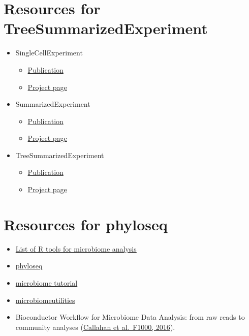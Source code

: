 \documentclass[
  oneside]{book}
\providecommand{\tightlist}{%
  \setlength{\itemsep}{0pt}\setlength{\parskip}{0pt}}
\begin{document}
\hypertarget{resources-for-treesummarizedexperiment}{%
\section{Resources for TreeSummarizedExperiment}\label{resources-for-treesummarizedexperiment}}

\begin{itemize}
\tightlist
\item
  SingleCellExperiment

  \begin{itemize}
  \tightlist
  \item
    \href{https://bioconductor.org/packages/release/bioc/vignettes/SingleCellExperiment/inst/doc/intro.html}{Publication}
  \item
    \href{https://bioconductor.org/packages/release/bioc/html/SingleCellExperiment.html}{Project page}
  \end{itemize}
\item
  SummarizedExperiment

  \begin{itemize}
  \tightlist
  \item
    \href{https://bioconductor.org/packages/release/bioc/vignettes/SummarizedExperiment/inst/doc/SummarizedExperiment.html}{Publication}
  \item
    \href{https://bioconductor.org/packages/release/bioc/html/SummarizedExperiment.html}{Project page}
  \end{itemize}
\item
  TreeSummarizedExperiment

  \begin{itemize}
  \tightlist
  \item
    \href{https://f1000research.com/articles/9-1246}{Publication}
  \item
    \href{https://www.bioconductor.org/packages/release/bioc/html/TreeSummarizedExperiment.html}{Project page}
  \end{itemize}
\end{itemize}

\hypertarget{resources-for-phyloseq}{%
\section{Resources for phyloseq}\label{resources-for-phyloseq}}

\begin{itemize}
\tightlist
\item
  \href{https://microsud.github.io/Tools-Microbiome-Analysis/}{List of R tools for microbiome analysis}
\item
  \href{http://journals.plos.org/plosone/article?id=10.1371/journal.pone.0061217}{phyloseq}
\item
  \href{http://microbiome.github.io/tutorials/}{microbiome tutorial}
\item
  \href{https://microsud.github.io/microbiomeutilities/}{microbiomeutilities}
\item
  Bioconductor Workflow for Microbiome Data Analysis: from raw reads to community analyses (\href{https://f1000research.com/articles/5-1492/v2}{Callahan et al.~F1000, 2016}).
\end{itemize}
\end{document}
